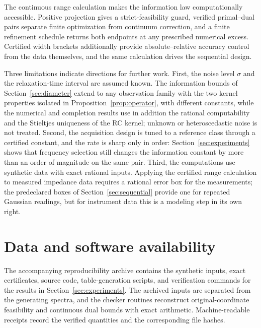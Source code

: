 \documentclass[10pt]{amsart}
\theoremstyle{definition}
\theoremstyle{remark}
\theoremstyle{plain}
\begin{document}
The continuous range calculation makes the information law computationally accessible. Positive projection gives a strict-feasibility guard, verified primal--dual pairs separate finite optimization from continuum correction, and a finite refinement schedule returns both endpoints at any prescribed numerical excess. Certified width brackets additionally provide absolute--relative accuracy control from the data themselves, and the same calculation drives the sequential design.

Three limitations indicate directions for further work. First, the noise level $\sigma$ and the relaxation-time interval are assumed known. The information bounds of Section~\ref{sec:diameter} extend to any observation family with the two kernel properties isolated in Proposition~\ref{prop:operator}, with different constants, while the numerical and completion results use in addition the rational computability and the Stieltjes uniqueness of the RC kernel; unknown or heteroscedastic noise is not treated. Second, the acquisition design is tuned to a reference class through a certified constant, and the rate is sharp only in order: Section~\ref{sec:experiments} shows that frequency selection still changes the information constant by more than an order of magnitude on the same pair. Third, the computations use synthetic data with exact rational inputs. Applying the certified range calculation to measured impedance data requires a rational error box for the measurements; the predeclared boxes of Section~\ref{sec:sequential} provide one for repeated Gaussian readings, but for instrument data this is a modeling step in its own right.

\section*{Data and software availability}
The accompanying reproducibility archive contains the synthetic inputs, exact certificates, source code, table-generation scripts, and verification commands for the results in Section~\ref{sec:experiments}. The archived inputs are separated from the generating spectra, and the checker routines reconstruct original-coordinate feasibility and continuous dual bounds with exact arithmetic. Machine-readable receipts record the verified quantities and the corresponding file hashes.
\end{document}

